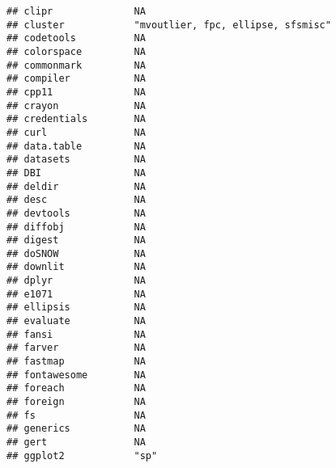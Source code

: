 \documentclass[
]{article}
\begin{document}
\begin{verbatim}
## clipr              NA                                                     
## cluster            "mvoutlier, fpc, ellipse, sfsmisc"                     
## codetools          NA                                                     
## colorspace         NA                                                     
## commonmark         NA                                                     
## compiler           NA                                                     
## cpp11              NA                                                     
## crayon             NA                                                     
## credentials        NA                                                     
## curl               NA                                                     
## data.table         NA                                                     
## datasets           NA                                                     
## DBI                NA                                                     
## deldir             NA                                                     
## desc               NA                                                     
## devtools           NA                                                     
## diffobj            NA                                                     
## digest             NA                                                     
## doSNOW             NA                                                     
## downlit            NA                                                     
## dplyr              NA                                                     
## e1071              NA                                                     
## ellipsis           NA                                                     
## evaluate           NA                                                     
## fansi              NA                                                     
## farver             NA                                                     
## fastmap            NA                                                     
## fontawesome        NA                                                     
## foreach            NA                                                     
## foreign            NA                                                     
## fs                 NA                                                     
## generics           NA                                                     
## gert               NA                                                     
## ggplot2            "sp"                                                   

\end{verbatim}
\end{document}
